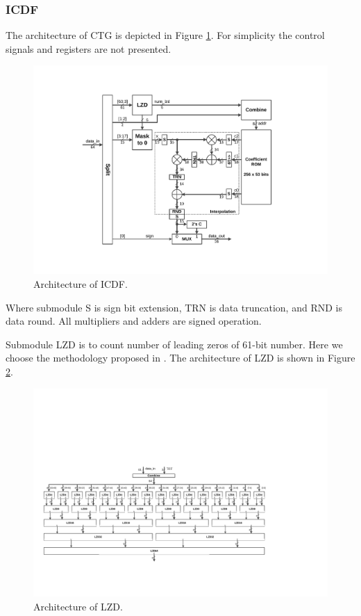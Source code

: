 \documentclass[a4paper, titlepage]{article}
\begin{document}
\subsubsection{ICDF}
The architecture of \textsf{CTG} is depicted in Figure \ref{fig:icdfarch}.
For simplicity the control signals and registers are not presented.
\begin{figure}[!htbp]
\centering
\includegraphics[scale=0.55,angle=270]{icdfarch.pdf}
\caption{Architecture of ICDF.}
\label{fig:icdfarch}
\end{figure}

Where submodule \textsf{S} is sign bit extension,
\textsf{TRN} is data truncation, and \textsf{RND} is data round.
All multipliers and adders are signed operation.

Submodule \textsf{LZD} is to count number of leading zeros of 61-bit number.
Here we choose the methodology proposed in \cite{oklobdzija}.
The architecture of \textsf{LZD} is shown in Figure \ref{fig:lzdarch}.
\begin{figure}[!htbp]
\centering
\includegraphics[scale=0.35,angle=270]{lzdarch.pdf}
\caption{Architecture of LZD.}
\label{fig:lzdarch}
\end{figure}
\end{document}
